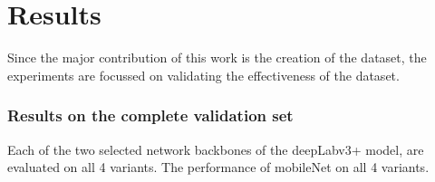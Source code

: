 
\chapter{Results}

Since the major contribution of this work is the creation of the dataset, the experiments are focussed on validating the effectiveness of the dataset. 


\subsection{Results on the complete validation set}


Each of the two selected network backbones of the deepLabv3+ model, are evaluated on all 4 variants. The performance of mobileNet on all 4 variants.

